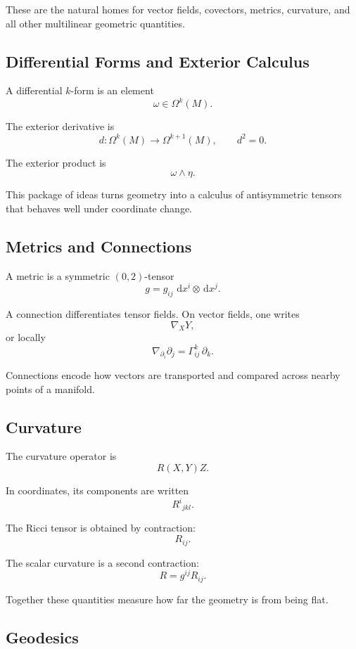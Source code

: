 \documentclass[11pt]{article}
\newcommand{\dd}{\,\mathrm{d}}
\begin{document}
These are the natural homes for vector fields, covectors, metrics, curvature,
and all other multilinear geometric quantities.

\subsection{Differential Forms and Exterior Calculus}

A differential \(k\)-form is an element
\[
  \omega \in \Omega^k(M).
\]

The exterior derivative is
\[
  d : \Omega^k(M) \to \Omega^{k+1}(M),
  \qquad
  d^2 = 0.
\]

The exterior product is
\[
  \omega \wedge \eta.
\]

This package of ideas turns geometry into a calculus of antisymmetric tensors
that behaves well under coordinate change.

\subsection{Metrics and Connections}

A metric is a symmetric \((0,2)\)-tensor
\[
  g = g_{ij}\,\dd x^i \otimes \dd x^j.
\]

A connection differentiates tensor fields. On vector fields, one writes
\[
  \nabla_X Y,
\]
or locally
\[
  \nabla_{\partial_i} \partial_j
  =
  \Gamma^k_{ij}\,\partial_k.
\]

Connections encode how vectors are transported and compared across nearby
points of a manifold.

\subsection{Curvature}

The curvature operator is
\[
  R(X,Y)Z.
\]

In coordinates, its components are written
\[
  R^i{}_{jkl}.
\]

The Ricci tensor is obtained by contraction:
\[
  R_{ij}.
\]

The scalar curvature is a second contraction:
\[
  R = g^{ij} R_{ij}.
\]

Together these quantities measure how far the geometry is from being flat.

\subsection{Geodesics}
\end{document}
